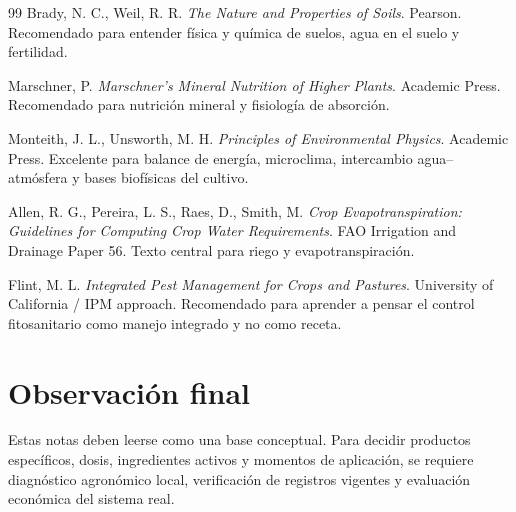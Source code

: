 \documentclass[11pt,a4paper]{article}
\begin{document}
\begin{thebibliography}{99}
Brady, N. C., Weil, R. R.
\newblock \emph{The Nature and Properties of Soils}.
\newblock Pearson.
\newblock Recomendado para entender física y química de suelos, agua en el suelo y fertilidad.

Marschner, P.
\newblock \emph{Marschner's Mineral Nutrition of Higher Plants}.
\newblock Academic Press.
\newblock Recomendado para nutrición mineral y fisiología de absorción.

Monteith, J. L., Unsworth, M. H.
\newblock \emph{Principles of Environmental Physics}.
\newblock Academic Press.
\newblock Excelente para balance de energía, microclima, intercambio agua--atmósfera y bases biofísicas del cultivo.

Allen, R. G., Pereira, L. S., Raes, D., Smith, M.
\newblock \emph{Crop Evapotranspiration: Guidelines for Computing Crop Water Requirements}.
\newblock FAO Irrigation and Drainage Paper 56.
\newblock Texto central para riego y evapotranspiración.

Flint, M. L.
\newblock \emph{Integrated Pest Management for Crops and Pastures}.
\newblock University of California / IPM approach.
\newblock Recomendado para aprender a pensar el control fitosanitario como manejo integrado y no como receta.

\end{thebibliography}

\section*{Observación final}

Estas notas deben leerse como una base conceptual. Para decidir productos específicos, dosis, ingredientes activos y momentos de aplicación, se requiere diagnóstico agronómico local, verificación de registros vigentes y evaluación económica del sistema real.
\end{document}
